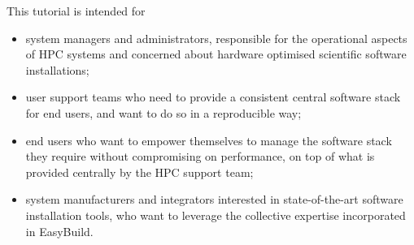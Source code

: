 This tutorial is intended for
\begin{itemize}
    \item system managers and administrators, responsible for the operational aspects of HPC systems and concerned about hardware optimised scientific software installations;
    \item user support teams who need to provide a consistent central software stack for end users, and want to do so in a reproducible way;
    \item end users who want to empower themselves to manage the software stack they require without compromising on performance, on top of what is provided centrally by the HPC support team;
    \item system manufacturers and integrators interested in state-of-the-art software installation tools, who want to leverage the collective expertise incorporated in EasyBuild.
\end{itemize}
